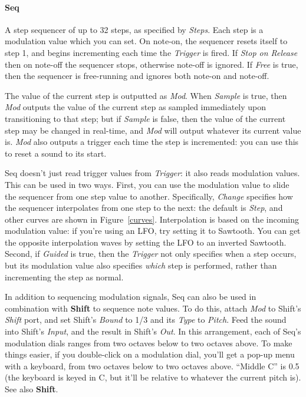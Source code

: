 \documentclass{article}
\begin{document}
\paragraph{Seq}  A step sequencer of up to 32 steps, as specified by {\it Steps}.  Each step is a modulation value which you can set.  On note-on, the sequencer resets itself to step 1, and begins incrementing each time the {\it Trigger} is fired.   If {\it Stop on Release} then on note-off the sequencer stops, otherwise note-off is ignored.  If {\it Free} is true, then the sequencer is free-running and ignores both note-on and note-off.    

The value of the current step is outputted as {\it Mod}.  When {\it Sample} is true, then {\it Mod} outputs the value of the current step as sampled immediately upon transitioning to that step; but if {\it Sample} is false, then the value of the current step may be changed in real-time, and {\it Mod} will output whatever its current value is.  {\it Mod} also outputs a trigger each time the step is incremented: you can use this to reset a sound to its start. 

Seq doesn't just read trigger values from {\it Trigger}: it also reads modulation values.  This can be used in two ways.  First, you can use the modulation value to slide the sequencer from one step value to another.  Specifically, {\it Change} specifies how the sequencer interpolates from one step to the next: the default is {\it Step}, and other curves are shown in Figure~\ref{curves}.  Interpolation is based on the incoming modulation value: if you're using an LFO, try setting it to Sawtooth.  You can get the opposite interpolation waves by setting the LFO to an inverted Sawtooth.   Second, if {\it Guided} is true, then the {\it Trigger} not only specifies when a step occurs, but its modulation value also specifies {\it which} step is performed, rather than incrementing the step as normal.

In addition to sequencing modulation signals, Seq can also be used in combination with {\bf Shift} to sequence note values.  To do this, attach {\it Mod} to Shift's {\it Shift} port, and set Shift's {\it Bound} to 1/3 and its {\it Type} to {\it Pitch}.  Feed the sound into Shift's {\it Input}, and the result in Shift's {\it Out}.  In this arrangement, each of Seq's modulation dials ranges from two octaves below to two octaves above.  To make things easier, if you double-click on a modulation dial, you'll get a pop-up menu with a keyboard, from two octaves below to two octaves above.  ``Middle C'' is 0.5 (the keyboard is keyed in C, but it'll be relative to whatever the current pitch is).  See also {\bf Shift}.
\end{document}
